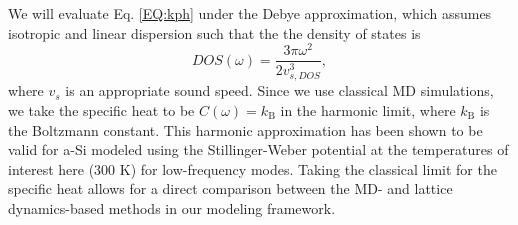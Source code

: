 \documentclass[aps,prb,onecolumn,preprint,superscriptaddress,footinbib,amsmath,amssymb,floatfix]{revtex4}
\begin{document}
We will evaluate Eq. \eqref{EQ:kph} under the Debye approximation, 
which assumes isotropic and linear dispersion such that the 
the density of states is
\begin{equation}\label{EQ:DOS_debye}
DOS(\omega) = \frac{3\pi\omega^2}{2v_{s,DOS}^3},
\end{equation}
where $v_s$ is an appropriate sound speed.\cite{ashcroft_solid_1976}  
Since we use classical MD simulations,\cite{mcquarrie_statistical_2000} 
we take the specific heat to be $C(\omega) = k_{\text{B}}$ in the 
harmonic limit, where $k_{\text{B}}$ is the Boltzmann constant. 
This harmonic approximation has been shown to be valid 
for a-Si modeled using the Stillinger-Weber potential at the temperatures of 
interest here (300 K) for low-frequency modes.\cite{feldman_thermal_1993} 
Taking the classical limit for the specific heat allows for a direct 
comparison between the MD- and lattice dynamics-based 
methods in our modeling framework.
\end{document}
